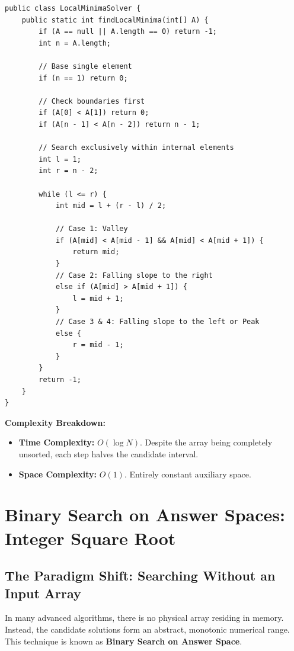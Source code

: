 \documentclass[10pt,journal,compsoc,onecolumn]{IEEEtran}
\begin{document}
\begin{verbatim}
public class LocalMinimaSolver {
    public static int findLocalMinima(int[] A) {
        if (A == null || A.length == 0) return -1;
        int n = A.length;

        // Base single element
        if (n == 1) return 0;

        // Check boundaries first
        if (A[0] < A[1]) return 0;
        if (A[n - 1] < A[n - 2]) return n - 1;

        // Search exclusively within internal elements
        int l = 1;
        int r = n - 2;

        while (l <= r) {
            int mid = l + (r - l) / 2;

            // Case 1: Valley
            if (A[mid] < A[mid - 1] && A[mid] < A[mid + 1]) {
                return mid;
            }
            // Case 2: Falling slope to the right
            else if (A[mid] > A[mid + 1]) {
                l = mid + 1;
            }
            // Case 3 & 4: Falling slope to the left or Peak
            else {
                r = mid - 1;
            }
        }
        return -1;
    }
}
\end{verbatim}

\textbf{Complexity Breakdown:}
\begin{itemize}
    \item \textbf{Time Complexity:} $O(\log N)$. Despite the array being completely unsorted, each step halves the candidate interval.
    \item \textbf{Space Complexity:} $O(1)$. Entirely constant auxiliary space.
\end{itemize}

\section{Binary Search on Answer Spaces: Integer Square Root}
\label{sec:sqrt}

\subsection{The Paradigm Shift: Searching Without an Input Array}

In many advanced algorithms, there is no physical array residing in memory. Instead, the candidate solutions form an abstract, monotonic numerical range. This technique is known as \textbf{Binary Search on Answer Space}.
\end{document}
